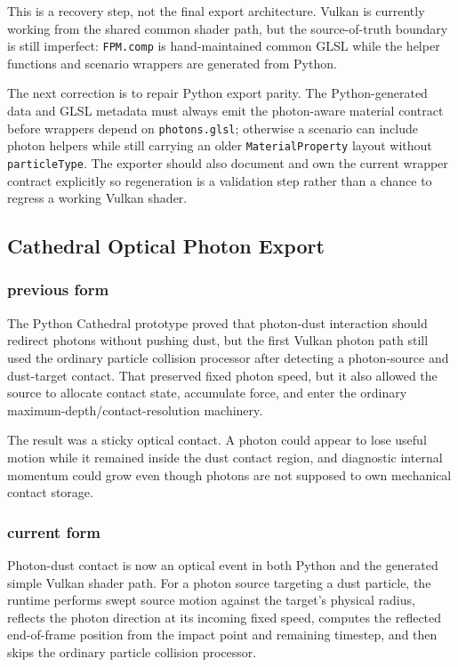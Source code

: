This is a recovery step, not the final export architecture.  Vulkan is
currently working from the shared common shader path, but the source-of-truth
boundary is still imperfect: \texttt{FPM.comp} is hand-maintained common GLSL
while the helper functions and scenario wrappers are generated from Python.

The next correction is to repair Python export parity.  The Python-generated
data and GLSL metadata must always emit the photon-aware material contract
before wrappers depend on \texttt{photons.glsl}; otherwise a scenario can
include photon helpers while still carrying an older \texttt{MaterialProperty}
layout without \texttt{particleType}.  The exporter should also document and
own the current wrapper contract explicitly so regeneration is a validation
step rather than a chance to regress a working Vulkan shader.

\subsection{Cathedral Optical Photon Export}

\subsubsection{previous form}

The Python Cathedral prototype proved that photon-dust interaction should
redirect photons without pushing dust, but the first Vulkan photon path still
used the ordinary particle collision processor after detecting a photon-source
and dust-target contact.  That preserved fixed photon speed, but it also
allowed the source to allocate contact state, accumulate force, and enter the
ordinary maximum-depth/contact-resolution machinery.

The result was a sticky optical contact.  A photon could appear to lose useful
motion while it remained inside the dust contact region, and diagnostic
internal momentum could grow even though photons are not supposed to own
mechanical contact storage.

\subsubsection{current form}

Photon-dust contact is now an optical event in both Python and the generated
simple Vulkan shader path.  For a photon source targeting a dust particle, the
runtime performs swept source motion against the target's physical radius,
reflects the photon direction at its incoming fixed speed, computes the
reflected end-of-frame position from the impact point and remaining timestep,
and then skips the ordinary particle collision processor.

